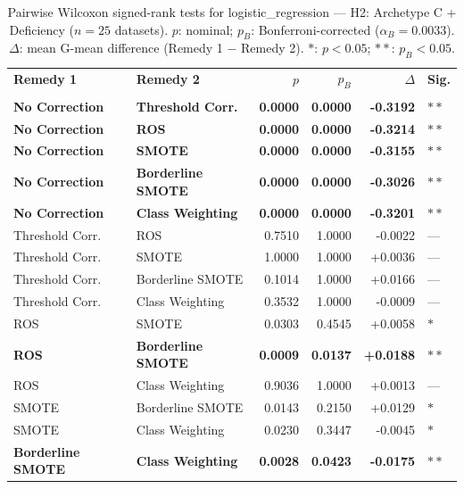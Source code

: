 \begin{table}[ht]
\centering
\scriptsize
\caption{Pairwise Wilcoxon signed-rank tests for logistic_regression --- H2: Archetype C + Deficiency ($n=25$ datasets). $p$: nominal; $p_B$: Bonferroni-corrected ($\alpha_B=0.0033$). $\Delta$: mean G-mean difference (Remedy 1 $-$ Remedy 2). $\ast$: $p<0.05$; $\ast\ast$: $p_B<0.05$.}
\label{tab:wilcoxon_logistic_regression_h2}
\begin{tabular}{llrrrl}
\toprule
\textbf{Remedy 1} & \textbf{Remedy 2} & \textbf{$p$} & \textbf{$p_B$} & \textbf{$\Delta$} &  \textbf{Sig.} \\\\
\midrule
    \textbf{No Correction} & \textbf{Threshold Corr.} & \textbf{0.0000} & \textbf{0.0000} & \textbf{-0.3192} & $\ast\ast$ \\
    \textbf{No Correction} & \textbf{ROS} & \textbf{0.0000} & \textbf{0.0000} & \textbf{-0.3214} & $\ast\ast$ \\
    \textbf{No Correction} & \textbf{SMOTE} & \textbf{0.0000} & \textbf{0.0000} & \textbf{-0.3155} & $\ast\ast$ \\
    \textbf{No Correction} & \textbf{Borderline SMOTE} & \textbf{0.0000} & \textbf{0.0000} & \textbf{-0.3026} & $\ast\ast$ \\
    \textbf{No Correction} & \textbf{Class Weighting} & \textbf{0.0000} & \textbf{0.0000} & \textbf{-0.3201} & $\ast\ast$ \\
    Threshold Corr. & ROS & 0.7510 & 1.0000 & -0.0022 & --- \\
    Threshold Corr. & SMOTE & 1.0000 & 1.0000 & +0.0036 & --- \\
    Threshold Corr. & Borderline SMOTE & 0.1014 & 1.0000 & +0.0166 & --- \\
    Threshold Corr. & Class Weighting & 0.3532 & 1.0000 & -0.0009 & --- \\
    ROS & SMOTE & 0.0303 & 0.4545 & +0.0058 & $\ast$ \\
    \textbf{ROS} & \textbf{Borderline SMOTE} & \textbf{0.0009} & \textbf{0.0137} & \textbf{+0.0188} & $\ast\ast$ \\
    ROS & Class Weighting & 0.9036 & 1.0000 & +0.0013 & --- \\
    SMOTE & Borderline SMOTE & 0.0143 & 0.2150 & +0.0129 & $\ast$ \\
    SMOTE & Class Weighting & 0.0230 & 0.3447 & -0.0045 & $\ast$ \\
    \textbf{Borderline SMOTE} & \textbf{Class Weighting} & \textbf{0.0028} & \textbf{0.0423} & \textbf{-0.0175} & $\ast\ast$ \\
\bottomrule
\end{tabular}
\end{table}